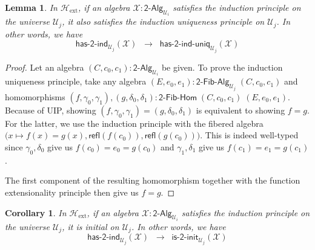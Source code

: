 \documentclass[11pt]{article}
\newcommand{\X}{\mathcal{X}}
\newcommand{\refl}{\mathsf{refl}}
\newcommand{\UU}{\mathcal{U}}
\newcommand{\BoolAlg}{\mathsf{2}\text{-}\mathsf{Alg}}
\newcommand{\HasBoolRec}{\mathsf{has}\text{-}\mathsf{2}\text{-}\mathsf{rec}}
\newcommand{\HasBoolInd}{\mathsf{has}\text{-}\mathsf{2}\text{-}\mathsf{ind}}
\newcommand{\HasBoolRecUniq}{\mathsf{has}\text{-}\mathsf{2}\text{-}\mathsf{rec}\text{-}\mathsf{uniq}}
\newcommand{\HasBoolIndUniq}{\mathsf{has}\text{-}\mathsf{2}\text{-}\mathsf{ind}\text{-}\mathsf{uniq}}
\newcommand{\BoolFibAlg}{\mathsf{2}\text{-}\mathsf{Fib}\text{-}\mathsf{Alg}}
\newcommand{\BoolFibHom}{\mathsf{2}\text{-}\mathsf{Fib}\text{-}\mathsf{Hom}}
\newcommand{\IsBoolInit}{\mathsf{is}\text{-}\mathsf{2}\text{-}\mathsf{init}}
\newcommand{\iscontr}{\mathsf{is}\text{-}\mathsf{contr}}
\newcommand{\isprop}{\mathsf{is}\text{-}\mathsf{prop}}
\newcommand{\Hext}{\mathcal{H}_{\mathrm{ext}}}
\newtheorem{lemma}[theorem]{Lemma}
\newtheorem{corollary}[theorem]{Corollary}
\theoremstyle{definition}
\begin{document}
\begin{lemma}\label{lem:BoolIndImpUniq}
In $\Hext$, if an algebra $\X : \BoolAlg_{\UU_i}$ satisfies the induction principle on the universe $\UU_j$, it also satisfies the induction uniqueness principle on $\UU_j$. In other words, we have
\[ \HasBoolInd_{\UU_j}(\X) \;\; \rightarrow \;\; \HasBoolIndUniq_{\UU_j}(\X) \]
\end{lemma}
\begin{proof}
Let an algebra $(C,c_0,c_1) : \BoolAlg_{\UU_i}$ be given. To prove the induction uniqueness principle, take any algebra $(E,e_0,e_1) : \BoolFibAlg_{\UU_j} \; (C,c_0,c_1)$ and homomorphisms $(f,\gamma_0, \gamma_1), (g,\delta_0,\delta_1) : \BoolFibHom \; (C,c_0,c_1) \; (E,e_0,e_1)$. Because of UIP, showing $(f,\gamma_0,\gamma_1) = (g,\delta_0,\delta_1)$ is equivalent to showing $f = g$. For the latter, we use the induction principle with the fibered algebra $\big(x \mapsto f(x) = g(x), \refl(f(c_0)), \refl(g(c_0))\big)$. This is indeed well-typed since
$\gamma_0,\delta_0$ give us $f(c_0) = e_0 = g(c_0)$ and $\gamma_1,\delta_1$ give us $f(c_1) = e_1 = g(c_1)$.  

The first component of the resulting homomorphism together with the function extensionality principle then give us $f = g$.
\end{proof}


\begin{corollary}
In $\Hext$, if an algebra $\X : \BoolAlg_{\UU_i}$ satisfies the induction principle on the universe $\UU_j$, it is initial on $\UU_j$. In other words, we have
\[ \HasBoolInd_{\UU_j}(\X) \;\; \rightarrow \;\; \IsBoolInit_{\UU_j}(\X) \]
\end{corollary}
\end{document}
